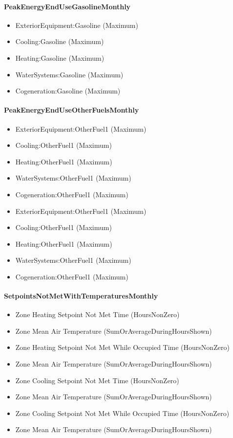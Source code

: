 \paragraph{PeakEnergyEndUseGasolineMonthly}\label{peakenergyendusegasolinemonthly}

\begin{itemize}
\item
  ExteriorEquipment:Gasoline (Maximum)
\item
  Cooling:Gasoline (Maximum)
\item
  Heating:Gasoline (Maximum)
\item
  WaterSystems:Gasoline (Maximum)
\item
  Cogeneration:Gasoline (Maximum)
\end{itemize}

\paragraph{PeakEnergyEndUseOtherFuelsMonthly}\label{peakenergyenduseotherfuelsmonthly}

\begin{itemize}
\item
  ExteriorEquipment:OtherFuel1 (Maximum)
\item
  Cooling:OtherFuel1 (Maximum)
\item
  Heating:OtherFuel1 (Maximum)
\item
  WaterSystems:OtherFuel1 (Maximum)
\item
  Cogeneration:OtherFuel1 (Maximum)
\item
  ExteriorEquipment:OtherFuel1 (Maximum)
\item
  Cooling:OtherFuel1 (Maximum)
\item
  Heating:OtherFuel1 (Maximum)
\item
  WaterSystems:OtherFuel1 (Maximum)
\item
  Cogeneration:OtherFuel1 (Maximum)
\end{itemize}

\paragraph{SetpointsNotMetWithTemperaturesMonthly}\label{setpointsnotmetwithtemperaturesmonthly}

\begin{itemize}
\item
  Zone Heating Setpoint Not Met Time (HoursNonZero)
\item
  Zone Mean Air Temperature (SumOrAverageDuringHoursShown)
\item
  Zone Heating Setpoint Not Met While Occupied Time (HoursNonZero)
\item
  Zone Mean Air Temperature (SumOrAverageDuringHoursShown)
\item
  Zone Cooling Setpoint Not Met Time (HoursNonZero)
\item
  Zone Mean Air Temperature (SumOrAverageDuringHoursShown)
\item
  Zone Cooling Setpoint Not Met While Occupied Time (HoursNonZero)
\item
  Zone Mean Air Temperature (SumOrAverageDuringHoursShown)
\end{itemize}

